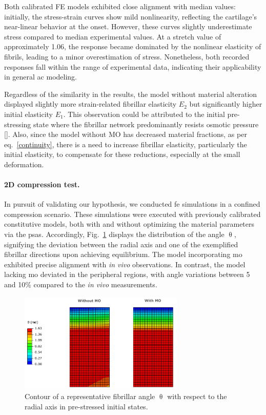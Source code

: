 \documentclass[12pt,a4paper]{report}
\begin{document}
Both calibrated FE models exhibited close alignment with median values: initially, the stress-strain curves show mild nonlinearity, reflecting the cartilage's near-linear behavior at the onset. However, these curves slightly underestimate stress compared to median experimental values. At a stretch value of approximately 1.06, the response became dominated by the nonlinear elasticity of fibrils, leading to a minor overestimation of stress. Nonetheless, both recorded responses fall within the range of experimental data, indicating their applicability in general \ac{ac} modeling.

Regardless of the similarity in the results, the model without material alteration displayed slightly more strain-related fibrillar elasticity $E_2$ but significantly higher initial elasticity $E_1$. This observation could be attributed to the initial pre-stressing state where the fibrillar network predominantly resists osmotic pressure [\cite{quiroga2017}]. Also, since the model without MO has decreased material fractions, as per eq.~\ref{continuity}, there is a need to increase fibrillar elasticity, particularly the initial elasticity, to compensate for these reductions, especially at the small deformation.

\paragraph{2D compression test.} In pursuit of validating our hypothesis, we conducted \ac{fe} simulations in a confined compression scenario. These simulations were executed with previously calibrated constitutive models, both with and without optimizing the material parameters via the \acp{psa}. Accordingly, Fig.~\ref{fig:fiber_orientation} displays the distribution of the angle $\uptheta$, signifying the deviation between the radial axis and one of the exemplified fibrillar directions upon achieving equilibrium. The model incorporating \ac{mo} exhibited precise alignment with \textit{in vivo} observations. In contrast, the model lacking \ac{mo} deviated in the peripheral regions, with angle variations between 5 and 10\% compared to the \textit{in vivo} measurements.
%
\begin{figure}\centering
\includegraphics[width=0.7\textwidth]{img/fiber_orientation.jpg}
\caption{Contour of a representative fibrillar angle $\uptheta$  with respect to the radial axis in pre-stressed initial states.}
\label{fig:fiber_orientation}
\end{figure}
\end{document}
